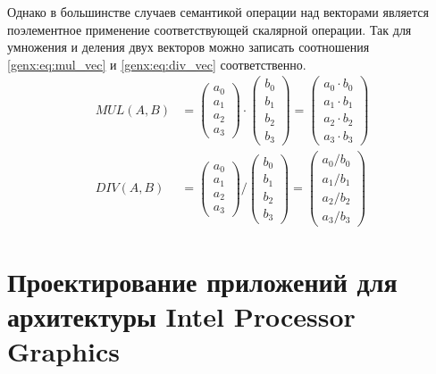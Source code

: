 Однако в большинстве случаев семантикой операции над векторами является поэлементное применение соответствующей скалярной операции.
Так для умножения и деления двух векторов можно записать соотношения \ref{genx:eq:mul_vec} и \ref{genx:eq:div_vec} соответственно.
\begin{align}
    \label{genx:eq:mul_vec}
    MUL(A, B) &= \begin{pmatrix} a_0 \\ a_1 \\ a_2 \\ a_3 \end{pmatrix} \cdot
    \begin{pmatrix} b_0 \\ b_1 \\ b_2 \\ b_3 \end{pmatrix} =
    \begin{pmatrix} a_0 \cdot b_0 \\ a_1 \cdot b_1 \\ a_2 \cdot b_2 \\ a_3 \cdot b_3 \end{pmatrix} \\
    \label{genx:eq:div_vec}
    DIV(A, B) &= \begin{pmatrix} a_0 \\ a_1 \\ a_2 \\ a_3 \end{pmatrix} /
    \begin{pmatrix} b_0 \\ b_1 \\ b_2 \\ b_3 \end{pmatrix} =
    \begin{pmatrix} a_0 / b_0 \\ a_1 / b_1 \\ a_2 / b_2 \\ a_3 / b_3 \end{pmatrix}
\end{align}

\section{Проектирование приложений для архитектуры \foreignlanguage{english}{Intel Processor Graphics}}

